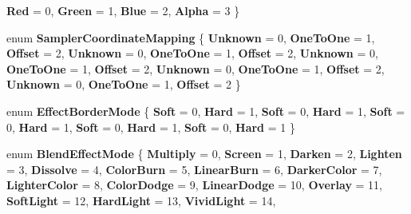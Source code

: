 \begin{DoxyCompactItemize}
{\bfseries Red} = 0, 
{\bfseries Green} = 1, 
{\bfseries Blue} = 2, 
{\bfseries Alpha} = 3
 \}
\item 
\mbox{\label{namespace_microsoft_1_1_graphics_1_1_canvas_1_1_effects_aee19f17bf119d8ef07f460eb2da92efe}} 
enum {\bfseries Sampler\+Coordinate\+Mapping} \{ \newline
{\bfseries Unknown} = 0, 
{\bfseries One\+To\+One} = 1, 
{\bfseries Offset} = 2, 
{\bfseries Unknown} = 0, 
\newline
{\bfseries One\+To\+One} = 1, 
{\bfseries Offset} = 2, 
{\bfseries Unknown} = 0, 
{\bfseries One\+To\+One} = 1, 
\newline
{\bfseries Offset} = 2, 
{\bfseries Unknown} = 0, 
{\bfseries One\+To\+One} = 1, 
{\bfseries Offset} = 2, 
\newline
{\bfseries Unknown} = 0, 
{\bfseries One\+To\+One} = 1, 
{\bfseries Offset} = 2
 \}
\item 
\mbox{\label{namespace_microsoft_1_1_graphics_1_1_canvas_1_1_effects_af071f1b230fa4fc760f6db8e5ad7d9db}} 
enum {\bfseries Effect\+Border\+Mode} \{ \newline
{\bfseries Soft} = 0, 
{\bfseries Hard} = 1, 
{\bfseries Soft} = 0, 
{\bfseries Hard} = 1, 
\newline
{\bfseries Soft} = 0, 
{\bfseries Hard} = 1, 
{\bfseries Soft} = 0, 
{\bfseries Hard} = 1, 
\newline
{\bfseries Soft} = 0, 
{\bfseries Hard} = 1
 \}
\item 
\mbox{\label{namespace_microsoft_1_1_graphics_1_1_canvas_1_1_effects_a2cba8d6181059b5f496c6734b739752e}} 
enum {\bfseries Blend\+Effect\+Mode} \{ \newline
{\bfseries Multiply} = 0, 
{\bfseries Screen} = 1, 
{\bfseries Darken} = 2, 
{\bfseries Lighten} = 3, 
\newline
{\bfseries Dissolve} = 4, 
{\bfseries Color\+Burn} = 5, 
{\bfseries Linear\+Burn} = 6, 
{\bfseries Darker\+Color} = 7, 
\newline
{\bfseries Lighter\+Color} = 8, 
{\bfseries Color\+Dodge} = 9, 
{\bfseries Linear\+Dodge} = 10, 
{\bfseries Overlay} = 11, 
\newline
{\bfseries Soft\+Light} = 12, 
{\bfseries Hard\+Light} = 13, 
{\bfseries Vivid\+Light} = 14, 

\end{DoxyCompactItemize}
